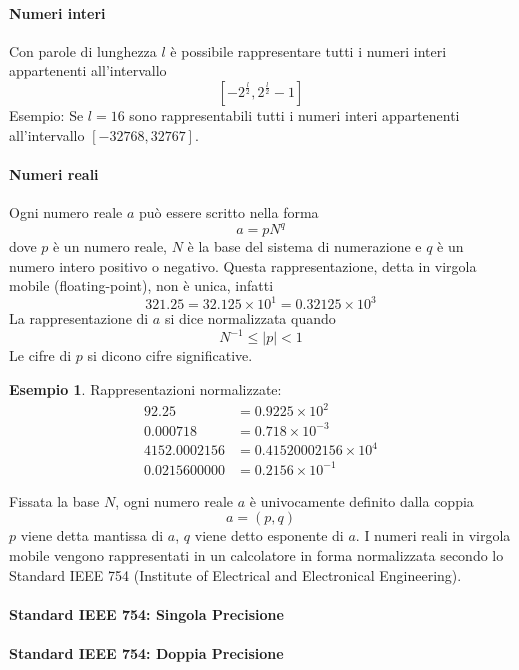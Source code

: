 \documentclass{article}
\theoremstyle{plain}
\theoremstyle{definition}
\newtheorem{exmp}{Esempio}[section]
\theoremstyle{remark}
\begin{document}
\paragraph{Numeri interi}
Con parole di lunghezza \(l\) è possibile rappresentare tutti i numeri interi appartenenti all'intervallo
\[ \left[ -2^{\frac{l}{2}}, 2^{\frac{l}{2}} - 1 \right] \]
Esempio: Se \(l = 16\) sono rappresentabili tutti i numeri interi appartenenti all'intervallo \([-32768, 32767]\).

\paragraph{Numeri reali}
Ogni numero reale \(a\) può essere scritto nella forma
\[ a = pN^q \]
dove \(p\) è un numero reale, \(N\) è la base del sistema di numerazione e \(q\) è un numero intero positivo o negativo.
Questa rappresentazione, detta in virgola mobile (floating-point), non è unica, infatti
\[ 321.25 = 32.125 \times 10^1 = 0.32125 \times 10^3 \]
La rappresentazione di \(a\) si dice normalizzata quando
\[ N^{-1} \leq |p| < 1 \]
Le cifre di \(p\) si dicono cifre significative.

\begin{exmp}
Rappresentazioni normalizzate:
\begin{align*}
92.25 &= 0.9225 \times 10^2 \\
0.000718 &= 0.718 \times 10^{-3} \\
4152.0002156 &= 0.41520002156 \times 10^4 \\
0.0215600000 &= 0.2156 \times 10^{-1}
\end{align*}
\end{exmp}


Fissata la base \(N\), ogni numero reale \(a\) è univocamente definito dalla coppia
\[ a = (p, q) \]
\(p\) viene detta mantissa di \(a\), \(q\) viene detto esponente di \(a\).
I numeri reali in virgola mobile vengono rappresentati in un calcolatore in forma normalizzata secondo lo Standard IEEE 754 (Institute of Electrical and Electronical Engineering).


\paragraph{Standard IEEE 754: Singola Precisione}
\paragraph{Standard IEEE 754: Doppia Precisione}
\end{document}
